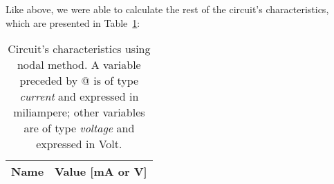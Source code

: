 Like above, we were able to calculate the rest of the circuit's characteristics, which are presented in Table~\ref{tab:nodetab}:

\begin{table}[H]
  \centering
  \begin{tabular}{|l|r|}
    \hline    
    {\bf Name} & {\bf Value [mA or V]} \\ \hline
    
  \end{tabular}
  \caption{Circuit's characteristics using nodal method. A variable preceded by @ is of type {\em current}
    and expressed in miliampere; other variables are of type {\it voltage} and expressed in
    Volt.}
  \label{tab:nodetab}
\end{table}
















